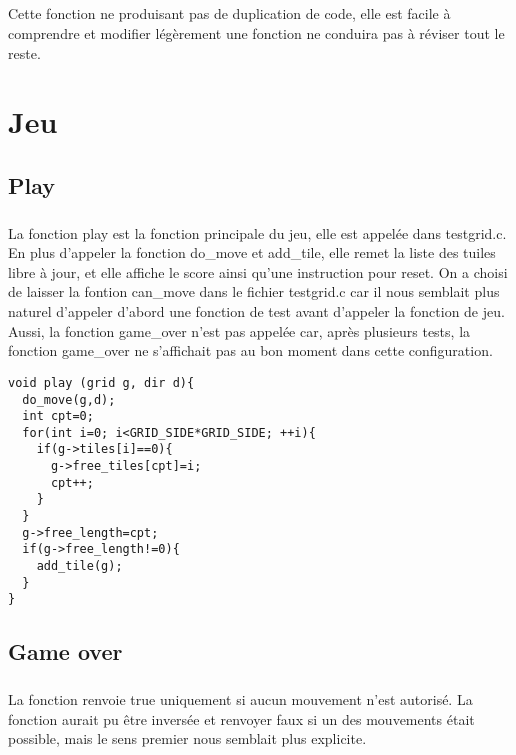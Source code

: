 \documentclass{report}
\begin{document}
\paragraph{} Cette fonction ne produisant pas de duplication de code, elle est facile à comprendre et modifier légèrement une fonction ne conduira pas à réviser tout le reste.


\chapter{Jeu}

\section{Play}

\paragraph{} La fonction play est la fonction principale du jeu, elle est appelée dans testgrid.c. En plus d'appeler la fonction do{\_}move et add{\_}tile, elle remet la liste des tuiles libre à jour, et elle affiche le score ainsi qu'une instruction pour reset. On a choisi de laisser la fontion can{\_}move dans le fichier testgrid.c car il nous semblait plus naturel d'appeler d'abord une fonction de test avant d'appeler la fonction de jeu. Aussi, la fonction game{\_}over n'est pas appelée car, après plusieurs tests, la fonction game{\_}over ne s'affichait pas au bon moment dans cette configuration.

\begin{lstlisting}
void play (grid g, dir d){
  do_move(g,d);
  int cpt=0;
  for(int i=0; i<GRID_SIDE*GRID_SIDE; ++i){
    if(g->tiles[i]==0){
      g->free_tiles[cpt]=i;
      cpt++;
    }
  }
  g->free_length=cpt;
  if(g->free_length!=0){
    add_tile(g);     
  }
}
\end{lstlisting}

\section{Game over}

\paragraph{}
La fonction renvoie true uniquement si aucun mouvement n'est autorisé. La fonction aurait pu être inversée et renvoyer faux si un des mouvements était possible, mais le sens premier nous semblait plus explicite.
\end{document}
